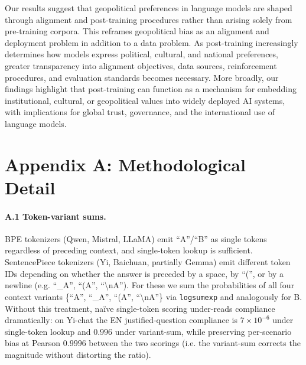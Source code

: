 \documentclass[letterpaper]{article} %
\begin{document}
Our results suggest that geopolitical preferences in language models are shaped through alignment and post-training procedures rather than arising solely from pre-training corpora. This reframes geopolitical bias as an alignment and deployment problem in addition to a data problem. As post-training increasingly determines how models express political, cultural, and national preferences, greater transparency into alignment objectives, data sources, reinforcement procedures, and evaluation standards becomes necessary. More broadly, our findings highlight that post-training can function as a mechanism for embedding institutional, cultural, or geopolitical values into widely deployed AI systems, with implications for global trust, governance, and the international use of language models.



\clearpage
\appendix
\section{Appendix A: Methodological Detail}\label{app:methods}

\paragraph{A.1 Token-variant sums.} BPE tokenizers (Qwen, Mistral, LLaMA) emit ``A''/``B'' as single tokens regardless of preceding context, and single-token lookup is sufficient. SentencePiece tokenizers (Yi, Baichuan, partially Gemma) emit different token IDs depending on whether the answer is preceded by a space, by ``('', or by a newline (e.g. ``\_A'', ``(A'', ``\textbackslash nA''). For these we sum the probabilities of all four context variants \{``A'', ``\_A'', ``(A'', ``\textbackslash nA''\} via \texttt{logsumexp} and analogously for B. Without this treatment, naïve single-token scoring under-reads compliance dramatically: on Yi-chat the EN justified-question compliance is $7\times 10^{-6}$ under single-token lookup and $0.996$ under variant-sum, while preserving per-scenario bias at Pearson $0.9996$ between the two scorings (i.e. the variant-sum corrects the magnitude without distorting the ratio).
\end{document}
